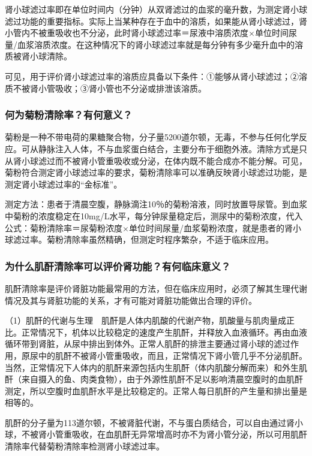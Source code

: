 肾小球滤过率即在单位时间内（分钟）从双肾滤过的血浆的毫升数，为测定肾小球滤过功能的重要指标。实际上当某种存在于血中的溶质，如果能从肾小球滤过，肾小管内不被重吸收也不分泌，此时肾小球滤过率＝尿液中溶质浓度×单位时间尿量/血浆溶质浓度。在这种情况下的肾小球滤过率就是每分钟有多少毫升血中的溶质被肾小球清除。

可见，用于评价肾小球滤过率的溶质应具备以下条件：①能够从肾小球滤过；②溶质不被肾小管吸收；③肾小管也不分泌或排泄该溶质。

\subsubsection{何为菊粉清除率？有何意义？}

菊粉是一种不带电荷的果糖聚合物，分子量5200道尔顿，无毒，不参与任何化学反应。可从静脉注入人体，不与血浆蛋白结合，主要分布于细胞外液。清除方式是只从肾小球滤过而不被肾小管重吸收或分泌，在体内既不能合成亦不能分解。可见，菊粉符合测定肾小球滤过率的要求，菊粉清除率可以准确反映肾小球滤过功能，是测定肾小球滤过率的“金标准”。

测定方法：患者于清晨空腹，静脉滴注10％的菊粉溶液，同时放置导尿管。到血浆中菊粉的浓度稳定在10mg/L水平，每分钟尿量稳定后，测尿中的菊粉浓度，代入公式：菊粉清除率＝尿菊粉浓度×单位时间尿量/血浆菊粉浓度，就是患者的肾小球滤过率。菊粉清除率虽然精确，但测定时程序繁杂，不适于临床应用。

\subsubsection{为什么肌酐清除率可以评价肾功能？有何临床意义？}

肌酐清除率是评价肾脏功能最常用的方法，但在临床应用时，必须了解其生理代谢情况及其与肾脏功能的关系，才有可能对肾脏功能做出合理的评价。

（1）肌酐的代谢与生理　肌酐是人体内肌酸的代谢产物，肌酸量与肌肉量成正比。正常情况下，机体以比较稳定的速度产生肌酐，并释放入血液循环。再由血液循环带到肾脏，从尿中排出到体外。正常人肌酐的排泄主要通过肾小球的滤过作用，原尿中的肌酐不被肾小管重吸收，而且，正常情况下肾小管几乎不分泌肌酐。当然，正常情况下人体内的肌酐来源包括内生肌酐（体内肌酸分解而来）和外生肌酐（来自摄入的鱼、肉类食物），由于外源性肌酐不足以影响清晨空腹时的血肌酐测定，所以空腹时血肌酐水平是比较稳定的。正常人每日肌酐的产生量和排出量是相等的。

肌酐的分子量为113道尔顿，不被肾脏代谢，不与蛋白质结合，可以自由通过肾小球，不被肾小管重吸收，在血肌酐无异常增高时亦不为肾小管分泌，所以可用肌酐清除率代替菊粉清除率检测肾小球滤过率。

